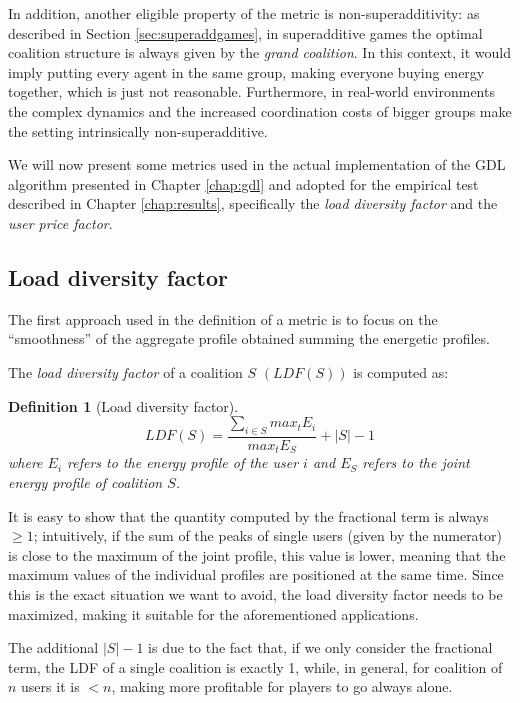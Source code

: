 \documentclass[11pt, twoside, titlepage, a4paper, openright]{report}
\newtheorem{Def}{Definition}
\begin{document}
In addition, another eligible property of the metric is non-superadditivity: as described in Section \ref{sec:superaddgames}, in superadditive games the optimal coalition structure is always given by the \textit{grand coalition}. In this context, it would imply putting every agent in the same group, making everyone buying energy together, which is just not reasonable. Furthermore, in real-world environments the complex dynamics and the increased coordination costs of bigger groups make the setting intrinsically non-superadditive.

We will now present some metrics used in the actual implementation of the GDL algorithm presented in Chapter \ref{chap:gdl} and adopted for the empirical test described in Chapter \ref{chap:results}, specifically the \textit{load diversity factor} and the \textit{user price factor}.

\subsection{Load diversity factor}

The first approach used in the definition of a metric is to focus on the ``smoothness'' of the aggregate profile obtained summing the energetic profiles.

The \textit{load diversity factor} of a coalition $S$ $(LDF(S))$ is computed as:
\begin{Def}[Load diversity factor]
\begin{equation}\label{eq:ldf}LDF\left(S\right)=\frac{\sum_{i \in S} {max}_t E_i}{{max}_t E_S} + |S| - 1\end{equation}
where $E_i$ refers to the energy profile of the user $i$ and $E_S$ refers to the joint energy profile of coalition $S$.
\end{Def}

\noindent It is easy to show that the quantity computed by the fractional term is always $\geq 1$; intuitively, if the sum of the peaks of single users (given by the numerator) is close to the maximum of the joint profile, this value is lower, meaning that the maximum values of the individual profiles are positioned at the same time.
Since this is the exact situation we want to avoid, the load diversity factor needs to be maximized, making it suitable for the aforementioned applications.

The additional $|S| - 1$ is due to the fact that, if we only consider the fractional term, the LDF of a single coalition is exactly 1, while, in general, for coalition of $n$ users it is $<n$, making more profitable for players to go always alone.
\end{document}
